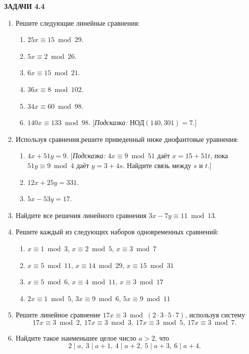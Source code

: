 \documentclass[11pt]{article}
\begin{document}
	\begin{center}
		\textbf{ЗАДАЧИ 4.4}
	\end{center}
	\begin{enumerate}
	\item Решите следующие линейные сравнения:
		\begin{enumerate}
			\item $25x\equiv 15\bmod{29}$.
			\item $5x\equiv 2\bmod{26}$.
			\item $6x\equiv 15\bmod{21}$.
			\item $36x\equiv 8\bmod{102}$.
			\item $34x\equiv 60\bmod{98}$.
			\item $140x\equiv 133\bmod{98}$. [\textit{Подсказка:} $\text{НОД}(140,301) = 7$.]
		\end{enumerate}
	\item Используя сравнения,решите приведенный ниже диофантовые уравнения:
		\begin{enumerate}
			\item $4x + 51y = 9$. [\textit{Подсказка:} $4x\equiv 9\bmod{51}$ даёт $x = 15 + 51t$, пока $51y\equiv 9\bmod{4}$ даёт $y = 3 + 4s$. Найдите связь между $s$ и $t$.]
			\item $12x + 25y = 331$.
			\item $5x - 53y = 17$.	
		\end{enumerate}
	\item Найдите все решения линейного сравнения $3x - 7y\equiv 11\bmod{13}$.
	\item Решите каждый из следующих наборов одновременных сравнений:
		\begin{enumerate}	
		\item $x\equiv 1\bmod{3}$, $x\equiv 2\bmod{5}$, $x\equiv 3\bmod{7}$
		\item $x\equiv 5\bmod{11}$, $x\equiv 14\bmod{29}$, $x\equiv 15\bmod{31}$
		\item $x\equiv 5\bmod{6}$, $x\equiv 4\bmod{11}$, $x\equiv 3\bmod{17}$
		\item $2x\equiv 1\bmod{5}$, $3x\equiv 9\bmod{6}$, $5x\equiv 9\bmod{11}$
		\end{enumerate}
	\item Решите линейное сравнение $17x\equiv 3\bmod{(2\cdot 3\cdot 5\cdot 7)}$, используя систему \[17x\equiv 3\bmod{2},\:17x\equiv 3\bmod{3},\:17x\equiv 3\bmod{5},\:17x\equiv 3\bmod{7}.\]
	\item Найдите такое наименьшее целое число $a > 2$, что \[2\mid a,\:3\mid a + 1,\:4\mid a +2,\:5\mid a +3,\:6\mid a + 4.\]

\end{enumerate}
\end{document}

